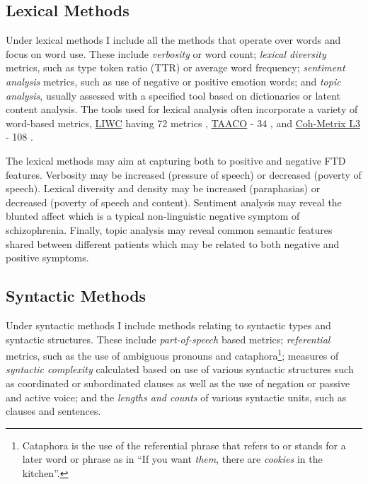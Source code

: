 \subsection{Lexical Methods}

Under lexical methods I include all the methods that operate over words and focus on word use. These include \textit{verbosity} or word count; \textit{lexical diversity} metrics, such as type token ratio (TTR) or average word frequency; \textit{sentiment analysis} metrics, such as use of negative or positive emotion words; and \textit{topic analysis}, usually assessed with a specified tool based on dictionaries or latent content analysis. The tools used for lexical analysis often incorporate a variety of word-based metrics, \href{https://www.liwc.app} {LIWC} having 72 metrics \citep{tausczik2010psychological}, \href{https://www.linguisticanalysistools.org/taaco.html}{TAACO} - 34 \citep{crossley2019tool}, and \href{http://cohmetrix.memphis.edu/cohmetrixhome/documentation_indices.html}{Coh-Metrix L3} - 108 \citep{mcnamara2014automated}. 

The lexical methods may aim at capturing both to positive and negative FTD features. Verbosity may be increased (pressure of speech) or decreased (poverty of speech). Lexical diversity and density may be increased (paraphasias) or decreased (poverty of speech and content). Sentiment analysis may reveal the blunted affect which is a typical non-linguistic negative symptom of schizophrenia. Finally, topic analysis may reveal common semantic features shared between different patients which may be related to both negative and positive symptoms.

\subsection{Syntactic Methods}

Under syntactic methods I include methods relating to syntactic types and syntactic structures. These include \textit{part-of-speech} based metrics; \textit{referential} metrics, such as the use of ambiguous pronouns and cataphora\footnote{Cataphora is the use of the referential phrase that refers to or stands for a later word or phrase as in ``If you want \textit{them}, there are \textit{cookies} in the kitchen''.}; measures of \textit{syntactic complexity} calculated based on use of various syntactic structures such as coordinated or subordinated clauses as well as the use of negation or passive and active voice; and the \textit{lengths and counts} of various syntactic units, such as clauses and sentences.

